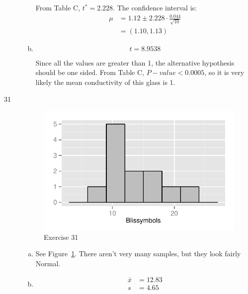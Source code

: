 \documentclass[letterpaper]{exam}
\begin{document}
\begin{description}
\begin{enumerate}[(a)]
            From Table C, $t^* = 2.228$. The confidence interval is:
            \begin{align*}
              \mu & = 1.12 \pm 2.228 \cdot \frac{0.044}{\sqrt{10}} \\
                  & = (1.10, 1.13)
            \end{align*}

          \item
            \[
              t = 8.9538
            \]

            Since all the values are greater than 1, the alternative hypothesis
            should be one sided. From Table C, $P-value < 0.0005$, so it is very
            likely the mean conductivity of this glass is 1.
        \end{enumerate}

      \item[31]
        \begin{figure}[H]
          \centering
          \includegraphics[scale = 1.0]{figures/ex31.pdf}
          \caption{Exercise 31}\label{fig:ex31}
        \end{figure}
        
        \begin{enumerate}[(a)]
          \item See Figure~\ref{fig:ex31}. There aren't very many samples, but
            they look fairly Normal.

          \item
            \begin{align*}
              \bar{x} & = 12.83 \\
              s       & = 4.65 \\
            \end{align*}


\end{enumerate}
\end{description}
\end{document}
